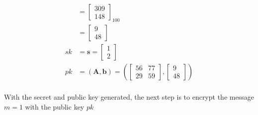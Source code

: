 \begin{align*}
             & = \begin{bmatrix}
                   309 \\
                   148\end{bmatrix}_{100}                            \\
             & = \begin{bmatrix}
                   9 \\ 
                   48 
                 \end{bmatrix}                                   \\
  sk         & = \textbf{s} =  \begin{bmatrix}1 \\ 2 \end{bmatrix} \\
  pk         & = (\textbf{A}, \textbf{b}) = \left (
  \begin{bmatrix}
      56 & 77   \\
      29 & 59 
    \end{bmatrix},
  \begin{bmatrix}
      9 \\
      48 
    \end{bmatrix} \right )                                           \\
\end{align*}

With the secret and public key generated, the next step is to encrypt the message $m=1$ with the public key $pk$

